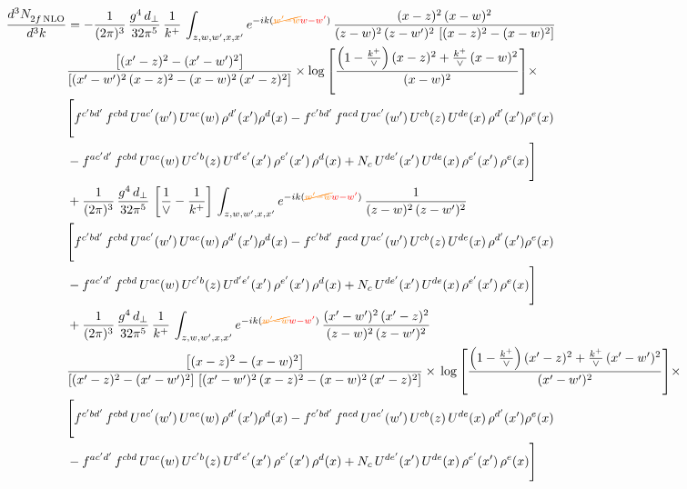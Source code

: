 \documentclass[9pt]{article}
\numberwithin{equation}{section}
\begin{document}
\begin{align}
    \frac{d^{3}N_{2f\,\rm NLO}^{\rm}}{d^{3}k}  & =   - \frac{1}{(2\pi)^{3}}\, \frac{g^{4}\,d_{\perp}}{32\pi^{5}}\,\frac{1}{k^{+}}\,\int_{z,w,w^{\prime},x,x'} e^{-ik({\color{orange}\cancel{w^{\prime}-w}}{\color{red}w-w^{\prime}})}\,\frac{(x-z)^{2}\, (x-w)^{2}}{(z-w)^{2}\, (z-w')^{2}\,\left[(x-z)^{2} - (x-w)^{2}\right]}\notag \\ & \frac{\left[(x'-z)^{2}-(x'-w')^{2}\right]}{\left[(x'-w')^{2}\, (x-z)^{2} - (x-w)^{2}\, (x'-z)^{2}\right]}\times \log{\left[\frac{\left(1-\frac{k^{+}}{\vee}\right)(x-z)^{2}+\frac{k^{+}}{\vee}\,(x-w)^{2}}{(x-w)^{2}}\right]}\times\notag \\ & \Bigg[f^{c'bd'}\,f^{cbd}\, U^{ac'}(w')\,U^{ac}(w)\,\rho^{d'}(x')\rho^{d}(x)- f^{c'bd'}\,f^{acd}\,U^{ac'}(w')\,U^{cb}(z)\,U^{de}(x)\,\rho^{d'}(x')\rho^{e}(x) \notag \\ & -f^{ac'd'}\,f^{cbd}\,U^{ac}(w)\,U^{c'b}(z)\,U^{d'e'}(x')\,\rho^{e'}(x')\,\rho^{d}(x) +N_{c}\,U^{de'}(x')\,U^{de}(x)\,\rho^{e'}(x')\,\rho^{e}(x)\Bigg]  \notag \\
& + \frac{1}{(2\pi)^{3}}\, \frac{g^{4}\,d_{\perp}}{32\pi^{5}}\,\left[\frac{1}{\vee} - \frac{1}{k^{+}}\right]\,\int_{z,w,w^{\prime},x,x'} e^{-ik({\color{orange}\cancel{w^{\prime}-w}}{\color{red}w-w^{\prime}})}\,\frac{1}{(z-w)^{2}\, (z-w')^{2}}\notag \\ & \Bigg[f^{c'bd'}\,f^{cbd}\, U^{ac'}(w')\,U^{ac}(w)\,\rho^{d'}(x')\rho^{d}(x)- f^{c'bd'}\,f^{acd}\,U^{ac'}(w')\,U^{cb}(z)\,U^{de}(x)\,\rho^{d'}(x')\rho^{e}(x) \notag \\ & -f^{ac'd'}\,f^{cbd}\,U^{ac}(w)\,U^{c'b}(z)\,U^{d'e'}(x')\,\rho^{e'}(x')\,\rho^{d}(x) +N_{c}\,U^{de'}(x')\,U^{de}(x)\,\rho^{e'}(x')\,\rho^{e}(x)\Bigg]  \notag \\
& + \frac{1}{(2\pi)^{3}}\, \frac{g^{4}\,d_{\perp}}{32\pi^{5}}\,\frac{1}{k^{+}}\,\int_{z,w,w^{\prime},x,x'} e^{-ik({\color{orange}\cancel{w^{\prime}-w}}{\color{red}w-w^{\prime}})}\,\frac{(x'-w')^{2}\, (x'-z)^{2}}{(z-w)^{2}\, (z-w')^{2}}\notag \\ & \frac{\left[(x-z)^{2} - (x-w)^{2}\right]}{\left[(x'-z)^{2} - (x'-w')^{2}\right]\, \left[(x'-w')^{2}\, (x - z)^{2} - (x-w)^{2}\,(x'-z)^{2}\right]}\times\, \log{\left[\frac{\left(1-\frac{k^{+}}{\vee}\right)(x'-z)^{2}+\frac{k^{+}}{\vee}\,(x'-w')^{2}}{(x'-w')^{2}}\right]}\times \notag \\ &  \Bigg[f^{c'bd'}\,f^{cbd}\, U^{ac'}(w')\,U^{ac}(w)\,\rho^{d'}(x')\rho^{d}(x)- f^{c'bd'}\,f^{acd}\,U^{ac'}(w')\,U^{cb}(z)\,U^{de}(x)\,\rho^{d'}(x')\rho^{e}(x) \notag \\ & -f^{ac'd'}\,f^{cbd}\,U^{ac}(w)\,U^{c'b}(z)\,U^{d'e'}(x')\,\rho^{e'}(x')\,\rho^{d}(x) +N_{c}\,U^{de'}(x')\,U^{de}(x)\,\rho^{e'}(x')\,\rho^{e}(x)\Bigg]
\end{align}
\end{document}
